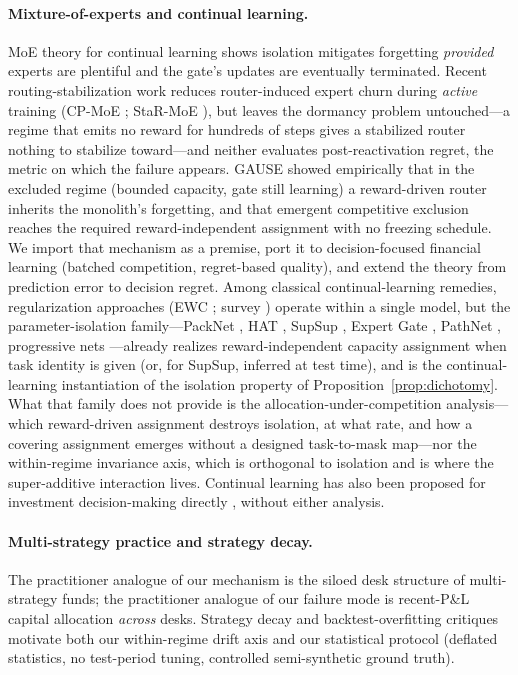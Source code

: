 \documentclass{article}
\begin{document}
\paragraph{Mixture-of-experts and continual learning.} MoE theory for
continual learning \citep{li2024moecl} shows isolation mitigates forgetting
\emph{provided} experts are plentiful and the gate's updates are eventually
terminated. Recent routing-stabilization work reduces router-induced
expert churn during \emph{active} training (CP-MoE \citep{liu2026cpmoe};
StaR-MoE \citep{guo2026starmoe}), but leaves the dormancy problem
untouched---a regime that emits no reward for hundreds of steps gives a
stabilized router nothing to stabilize toward---and neither evaluates
post-reactivation regret, the metric on which the failure appears.
GAUSE \citep{li2026gause} showed empirically that in the excluded
regime (bounded capacity, gate still learning) a reward-driven router
inherits the monolith's forgetting, and that emergent competitive exclusion
reaches the required reward-independent assignment with no freezing schedule.
We import that mechanism as a premise, port it to decision-focused financial
learning (batched competition, regret-based quality), and extend the theory
from prediction error to decision regret. Among classical
continual-learning remedies, regularization approaches (EWC
\citep{kirkpatrick2017overcoming}; survey \citep{parisi2019continual})
operate within a single model, but the parameter-isolation
family---PackNet \citep{mallya2018packnet}, HAT \citep{serra2018hat},
SupSup \citep{wortsman2020supsup}, Expert Gate
\citep{aljundi2017expertgate}, PathNet \citep{fernando2017pathnet},
progressive nets \citep{rusu2016progressive}---already realizes
reward-independent capacity assignment when task identity is given (or,
for SupSup, inferred at test time), and
is the continual-learning instantiation of the isolation property of
Proposition~\ref{prop:dichotomy}. What that family does not provide is
the allocation-under-competition analysis---which reward-driven
assignment destroys isolation, at what rate, and how a covering
assignment emerges without a designed task-to-mask map---nor the
within-regime invariance axis, which is orthogonal to isolation and is
where the super-additive interaction lives. Continual learning has also
been proposed for investment decision-making directly
\citep{philps2018continual}, without either analysis.

\paragraph{Multi-strategy practice and strategy decay.} The practitioner
analogue of our mechanism is the siloed desk structure of multi-strategy
funds; the practitioner analogue of our failure mode is recent-P\&L capital
allocation \emph{across} desks. Strategy decay \citep{mclean2016does} and
backtest-overfitting critiques \citep{bailey2014deflated, harvey2016backtesting,
lopez2018advances} motivate both our within-regime drift axis and our
statistical protocol (deflated statistics, no test-period tuning,
controlled semi-synthetic ground truth).
\end{document}
